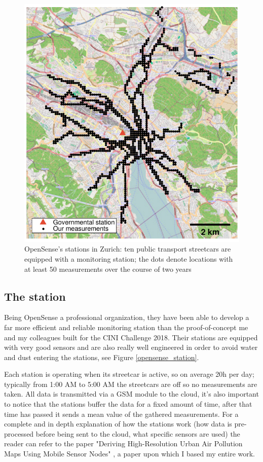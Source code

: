 \documentclass[11pt,a4paper,titlepage]{book}
\begin{document}
\begin{figure}[ht]
    \centering
    \includegraphics[scale=0.85]{imgs/ch_1/OpenSense_map_trams.png}
    \caption{OpenSense's stations in Zurich: ten public transport streetcars are equipped with a monitoring station; the dots denote locations with at least 50 measurements over the course of two years}
    \label{opensense_dots_zurich}
\end{figure}
\subsection{The station}
Being OpenSense a professional organization, they have been able to develop a far more efficient and reliable monitoring station than the proof-of-concept me and my colleagues built for the CINI Challenge 2018. Their stations are equipped with very good sensors and are also really well engineered in order to avoid water and dust entering the stations, see Figure \ref{opensense_station}.

Each station is operating when its streetcar is active, so on average 20h per day; typically from 1:00 AM to 5:00 AM the streetcars are off so no measurements are taken. All data is transmitted via a GSM module to the cloud, it's also important to notice that the stations buffer the data for a fixed amount of time, after that time has passed it sends a mean value of the gathered measurements.
\newline
\newline
For a complete and in depth explanation of how the stations work (how data is pre-processed before being sent to the cloud, what specific sensors are used) the reader can refer to the paper "Deriving High-Resolution Urban Air Pollution Maps Using Mobile Sensor Nodes" \cite{Deriving-High-Res-Maps}, a paper upon which I based my entire work. 
\end{document}
